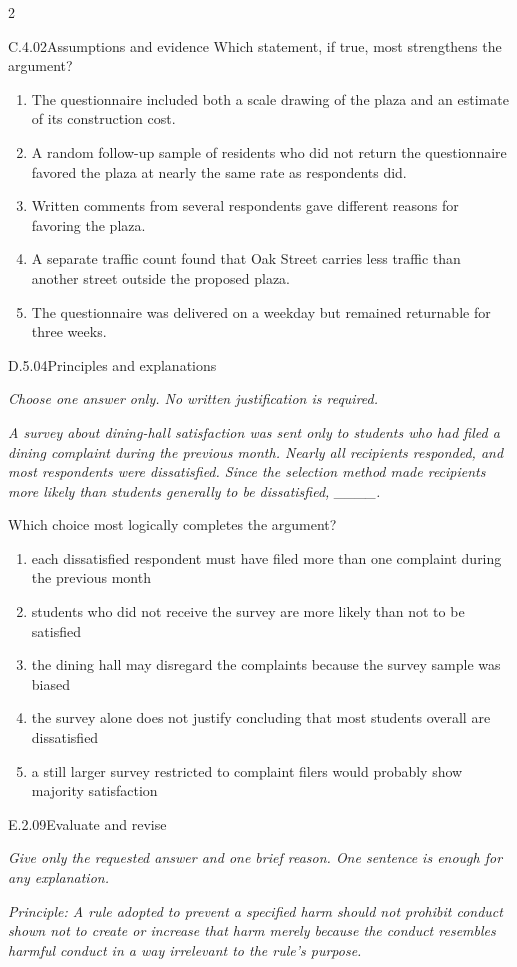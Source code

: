 \documentclass[9pt]{extarticle}
\newcommand{\choice}[1]{\item #1}
\begin{document}
\begin{multicols}{2}
\begin{DenseCoreProblem}{C.4.02}{Assumptions and evidence}
Which statement, if true, most strengthens the argument?
\begin{enumerate}[label=(\alph*)]
  \choice{The questionnaire included both a scale drawing of the plaza and an estimate of its construction cost.}
  \choice{A random follow-up sample of residents who did not return the questionnaire favored the plaza at nearly the same rate as respondents did.}
  \choice{Written comments from several respondents gave different reasons for favoring the plaza.}
  \choice{A separate traffic count found that Oak Street carries less traffic than another street outside the proposed plaza.}
  \choice{The questionnaire was delivered on a weekday but remained returnable for three weeks.}
\end{enumerate}
\end{DenseCoreProblem}
\begin{DenseCoreProblem}{D.5.04}{Principles and explanations}
{\scriptsize\textit{Choose one answer only. No written justification is required.}\par}
\emph{A survey about dining-hall satisfaction was sent only to students who had filed a dining complaint during the previous month. Nearly all recipients responded, and most respondents were dissatisfied. Since the selection method made recipients more likely than students generally to be dissatisfied, \_\_\_\_.}

Which choice most logically completes the argument?
\begin{enumerate}[label=(\alph*)]
  \choice{each dissatisfied respondent must have filed more than one complaint during the previous month}
  \choice{students who did not receive the survey are more likely than not to be satisfied}
  \choice{the dining hall may disregard the complaints because the survey sample was biased}
  \choice{the survey alone does not justify concluding that most students overall are dissatisfied}
  \choice{a still larger survey restricted to complaint filers would probably show majority satisfaction}
\end{enumerate}
\end{DenseCoreProblem}
\begin{DenseCoreProblem}{E.2.09}{Evaluate and revise}
{\scriptsize\textit{Give only the requested answer and one brief reason. One sentence is enough for any explanation.}\par}
\emph{Principle: A rule adopted to prevent a specified harm should not prohibit conduct shown not to create or increase that harm merely because the conduct resembles harmful conduct in a way irrelevant to the rule's purpose.}


\end{DenseCoreProblem}
\end{multicols}
\end{document}

